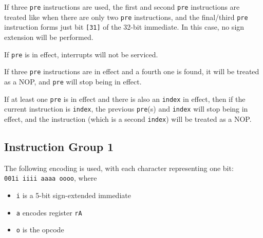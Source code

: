 \documentclass{article}
\begin{document}
	If three \texttt{pre} instructions are used, the first and second
	\texttt{pre} instructions are treated like when there are only two
	\texttt{pre} instructions, and the final/third \texttt{pre} instruction
	forms just bit \texttt{[31]} of the 32-bit immediate.  In this case, no
	sign extension will be performed.

	If \texttt{pre} is in effect, interrupts will not be serviced.




	If three \texttt{pre} instructions are in effect and a fourth one is
	found, it will be treated as a NOP, and \texttt{pre} will stop being in
	effect. 

	If at least one \texttt{pre} is in effect and there is also an
	\texttt{index} in effect, then if the current instruction is
	\texttt{index}, the previous \texttt{pre}(s) and \texttt{index} will
	stop being in effect, and the instruction (which is a second
	\texttt{index}) will be treated as a NOP.




	\subsection{Instruction Group 1}
	The following encoding is used, with each character representing one
	bit:  \\
	\texttt{001i iiii aaaa oooo}, where

	\singlespacing
	\begin{itemize}
		\item \texttt{i} is a 5-bit sign-extended immediate
		\item \texttt{a} encodes register \texttt{rA}
		\item \texttt{o} is the opcode
	\end{itemize}
	\doublespacing
\end{document}
